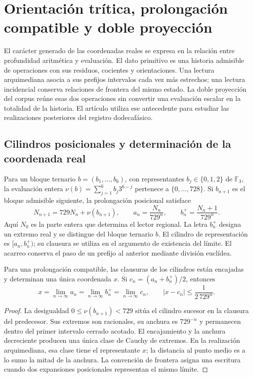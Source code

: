 \section{Orientación trítica, prolongación compatible y doble proyección}
\label{sec:trit-projection}

El carácter generado de las coordenadas reales se expresa en la relación
entre profundidad aritmética y evaluación. El dato primitivo es una historia
admisible de operaciones con sus residuos, cocientes y orientaciones. Una
lectura arquimediana asocia a sus prefijos intervalos cada vez más estrechos;
una lectura incidencial conserva relaciones de frontera del mismo estado.
La doble proyección del corpus \cite{hmtI,HMT-IX} reúne esas dos operaciones
sin convertir una evaluación escalar en la totalidad de la historia. El
artículo utiliza ese antecedente para estudiar las realizaciones posteriores
del registro dodecafásico.

\subsection{Cilindros posicionales y determinación de la coordenada real}

Para un bloque ternario \(b=(b_1,\ldots,b_6)\), con representantes
\(b_j\in\{0,1,2\}\) de \(\mathbb F_3\), la evaluación entera
\(\nu(b)=\sum_{j=1}^6b_j3^{6-j}\) pertenece a
\(\{0,\ldots,728\}\). Si \(b_{n+1}\) es el bloque admisible siguiente,
la prolongación posicional satisface
\[
 N_{n+1}=729N_n+\nu(b_{n+1}),\qquad
 a_n=\frac{N_n}{729^n},\qquad b_n^+=\frac{N_n+1}{729^n}.
\]
Aquí \(N_0\) es la parte entera que determina el lector regional. La letra
\(b_n^+\) designa un extremo real y se distingue del bloque ternario \(b\).
El cilindro de representación es \([a_n,b_n^+)\); su clausura se utiliza
en el argumento de existencia del límite. El acarreo conserva el paso de
un prefijo al anterior mediante división euclídea.

\begin{proposition}
Para una prolongación compatible, las clausuras de los cilindros están
encajadas y determinan una única coordenada \(x\). Si
\(c_n=(a_n+b_n^+)/2\), entonces
\[
 x=\lim_{n\to\infty}a_n=\lim_{n\to\infty}b_n^+
 =\lim_{n\to\infty}c_n,\qquad
 |x-c_n|\leq\frac1{2\,729^n}.
\]
\end{proposition}
\begin{proof}
La desigualdad \(0\leq\nu(b_{n+1})<729\) sitúa el cilindro sucesor en
la clausura del predecesor. Sus extremos son racionales, su anchura es
\(729^{-n}\) y permanecen dentro del primer intervalo cerrado acotado.
El encajamiento y la anchura decreciente producen una única clase de
Cauchy de extremos. En la realización arquimediana, esa clase tiene el
representante \(x\); la distancia al punto medio es a lo sumo la mitad
de la anchura. La convención de frontera asigna una escritura cuando dos
expansiones posicionales representan el mismo límite.
\end{proof}

